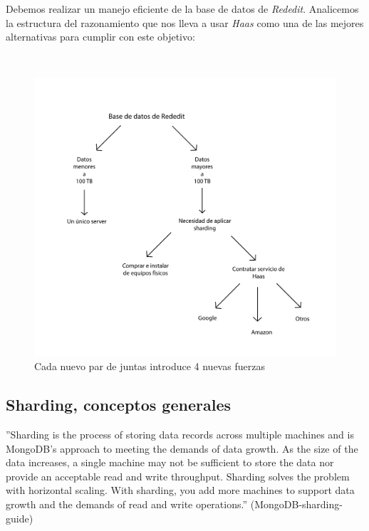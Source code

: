 Debemos realizar un manejo eficiente de la base de datos de \emph{Rededit}. Analicemos la estructura del razonamiento que 
nos lleva a usar \emph{Haas} como una de las mejores alternativas para cumplir con este objetivo:

~

\begin{figure}[!h]
	\begin{center}
		  \includegraphics[keepaspectratio]{imagenes/im_1.pdf}
		  \caption{Cada nuevo par de juntas introduce 4 nuevas fuerzas}
		  \label{fig:contra1}
	\end{center}
\end{figure}
\FloatBarrier



\subsection{Sharding, conceptos generales}

''Sharding is the process of storing data records across multiple machines and is MongoDB’s approach to meeting the
demands of data growth. As the size of the data increases, a single machine may not be sufficient to store the data nor
provide an acceptable read and write throughput. Sharding solves the problem with horizontal scaling. With sharding,
you add more machines to support data growth and the demands of read and write operations.'' (MongoDB-sharding-guide)

